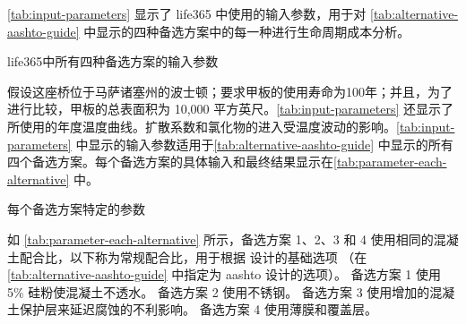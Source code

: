 \cref{tab:input-parameters} 显示了 \gls{life365} 中使用的输入参数，用于对 \cref{tab:alternative-aashto-guide} 中显示的四种备选方案中的每一种进行生命周期成本分析。

\begin{table}
  \caption{\gls{life365}中所有四种备选方案的输入参数}\label{tab:input-parameters}
\end{table}

假设这座桥位于马萨诸塞州的波士顿；要求甲板的使用寿命为100年；并且，为了进行比较，甲板的总表面积为 10,000 平方英尺。\cref{tab:input-parameters} 还显示了所使用的年度温度曲线。扩散系数和氯化物的进入受温度波动的影响。\cref{tab:input-parameters} 中显示的输入参数适用于\cref{tab:alternative-aashto-guide} 中显示的所有四个备选方案。每个备选方案的具体输入和最终结果显示在\cref{tab:parameter-each-alternative} 中。

\begin{table}
  \caption{每个备选方案特定的参数}
  \label{tab:parameter-each-alternative}
\end{table}

如 \cref{tab:parameter-each-alternative} 所示，备选方案 1、2、3 和 4 使用相同的混凝土配合比，以下称为常规配合比，用于根据 \lrfd 设计的基础选项 （在 \cref{tab:alternative-aashto-guide} 中指定为 \gls*{aashto} 设计的选项）。 备选方案 1 使用 5\% 硅粉使混凝土不透水。 备选方案 2 使用不锈钢。 备选方案 3 使用增加的混凝土保护层来延迟腐蚀的不利影响。 备选方案 4 使用薄膜和覆盖层。

